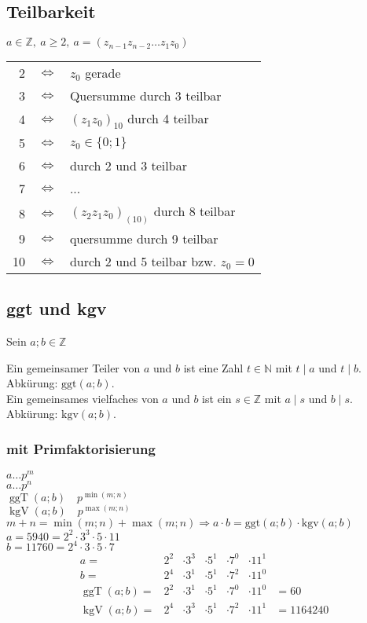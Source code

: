 \documentclass[12pt,a4paper]{article}
\DeclareMathOperator\ggt{ggT}
\DeclareMathOperator\kgv{kgV}
\begin{document}
\subsection{Teilbarkeit}
$a \in \mathbb{Z},\ a \geq 2,\ a=(z_{n-1}z_{n-2} \dots z_1z_0)$ \\
\begin{tabular}{rcl}
	2  & $\Leftrightarrow$ & $z_0$ gerade                         \\
	3  & $\Leftrightarrow$ & Quersumme durch 3 teilbar            \\
	4  & $\Leftrightarrow$ & $(z_1z_0)_{10}$ durch 4 teilbar      \\
	5  & $\Leftrightarrow$ & $z_0 \in \lbrace 0; 1 \rbrace$       \\
	6  & $\Leftrightarrow$ & durch 2 und 3 teilbar                \\
	7  & $\Leftrightarrow$ & ...                                  \\
	8  & $\Leftrightarrow$ & $(z_2z_1z_0)_{(10)}$ durch 8 teilbar \\
	9  & $\Leftrightarrow$ & quersumme durch 9 teilbar            \\
	10 & $\Leftrightarrow$ & durch 2 und 5 teilbar bzw. $z_0=0$
\end{tabular}
\subsection{ggt und kgv}
Sein $a;b \in \mathbb{Z}$

Ein gemeinsamer Teiler von $a$ und $b$ ist eine Zahl $t \in \mathbb{N}$ mit $t \mid a$ und $t \mid b$. Abkürung: $\textrm{ggt}(a;b)$. \\
Ein gemeinsames vielfaches von $a$ und $b$ ist ein $s \in \mathbb{Z}$ mit $a \mid s$ und $b \mid s$. Abkürung: $\textrm{kgv}(a;b)$. \\
\subsubsection{mit Primfaktorisierung}
$a \dots p^m$ \\
$a \dots p^n$ \\
$\ggt(a;b)\quad p^{\min(m;n)}$ \\
$\kgv(a;b)\quad p^{\max(m;n)}$ \\
$m + n = \min(m;n) + \max(m;n) \Rightarrow a \cdot b = \textrm{ggt}(a;b) \cdot \textrm{kgv}(a;b)$\\
$a = 5940 = 2^2 \cdot 3^3 \cdot 5 \cdot 11$ \\
$b = 11760 = 2^4 \cdot 3 \cdot 5 \cdot 7$ \\
$$\begin{array}{rcccccl}
		a =         & 2^2 & \cdot 3^3 & \cdot 5^1 & \cdot 7^0 & \cdot 11^1             \\
		b =         & 2^4 & \cdot 3^1 & \cdot 5^1 & \cdot 7^2 & \cdot 11^0             \\
		\ggt(a;b) = & 2^2 & \cdot 3^1 & \cdot 5^1 & \cdot 7^0 & \cdot 11^0 & = 60      \\
		\kgv(a;b) = & 2^4 & \cdot 3^3 & \cdot 5^1 & \cdot 7^2 & \cdot 11^1 & = 1164240
	\end{array}$$
\end{document}
